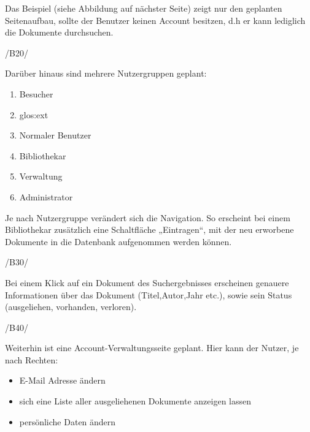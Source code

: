 Das Beispiel (siehe Abbildung auf nächster Seite) zeigt nur den geplanten Seitenaufbau, sollte der Benutzer keinen
Account besitzen, d.h er kann lediglich die Dokumente durchsuchen.

/B20/

Darüber hinaus sind mehrere Nutzergruppen geplant:

\begin{enumerate}
\item Besucher
\item \Gls{glos:ext}
\item Normaler Benutzer
\item Bibliothekar
\item Verwaltung
\item Administrator
\end{enumerate}

Je nach Nutzergruppe verändert sich die Navigation. So erscheint bei einem Bibliothekar zusätzlich eine 
Schaltfläche „Eintragen“, mit der neu erworbene Dokumente in die Datenbank aufgenommen werden können.


/B30/

Bei einem Klick auf ein Dokument des Suchergebnisses erscheinen genauere Informationen über das Dokument (Titel,Autor,Jahr etc.), sowie
sein Status (ausgeliehen, vorhanden, verloren).

/B40/

Weiterhin ist eine Account-Verwaltungsseite geplant.
\newline
\newline
Hier kann der Nutzer, je nach Rechten:

\begin{itemize}
\item E-Mail Adresse ändern
\item sich eine Liste aller ausgeliehenen Dokumente anzeigen lassen
\item persönliche Daten ändern
\end{itemize}





 
